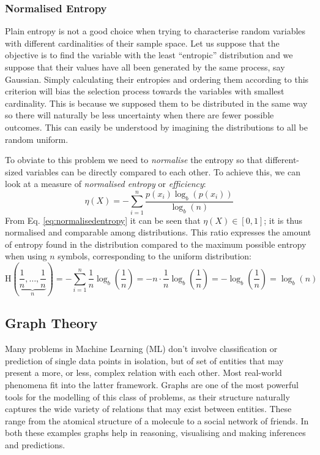 \subsubsection{Normalised Entropy}
Plain entropy is not a good choice when trying to characterise random variables with different cardinalities of their sample space.
Let us suppose that the objective is to find the variable with the least \enquote{entropic} distribution and we suppose that their values have all been generated by the same process, say Gaussian.
Simply calculating their entropies and ordering them according to this criterion will bias the selection process towards the variables with smallest cardinality.
This is because we supposed them to be distributed in the same way so there will naturally be less uncertainty when there are fewer possible outcomes.
This can easily be understood by imagining the distributions to all be random uniform.

To obviate to this problem we need to \textit{normalise} the entropy so that different-sized variables can be directly compared to each other.
To achieve this, we can look at a measure of \textit{normalised entropy} or \textit{efficiency}:
\begin{equation} \label{eq:normalisedentropy}
 	\eta(X)=-\sum_{i=1}^{n} \frac{p\left(x_{i}\right) \log _{b}\left(p\left(x_{i}\right)\right)}{\log _{b}(n)}
\end{equation}
From Eq. \ref{eq:normalisedentropy} it can be seen that $\eta(X) \in [0,1]$; it is thus normalised and comparable among distributions.
This ratio expresses the amount of entropy found in the distribution compared to the maximum possible entropy when using $n$ symbols, corresponding to the uniform distribution:
\begin{equation}
\mathrm{H}\left(\underbrace{\frac{1}{n}, \ldots, \frac{1}{n}}_{n}\right) = - \sum_{i=1}^n \frac{1}{n} \log _{b} \left( \frac{1}{n} \right) = -n \cdot \frac{1}{n} \log _{b} \left( \frac{1}{n} \right) = - \log _{b} \left( \frac{1}{n} \right) = \log _{b}(n) 
\end{equation}   

\subsection{Graph Theory}
Many problems in Machine Learning (ML) don't involve classification or prediction of single data points in isolation, but of set of entities that may present a more, or less, complex relation with each other. 
Most real-world phenomena fit into the latter framework.
Graphs are one of the most powerful tools for the modelling of this class of problems, as their structure naturally captures the wide variety of relations that may exist between entities.
These range from the atomical structure of a molecule to a social network of friends.  
In both these examples graphs help in reasoning, visualising and making inferences and predictions.

